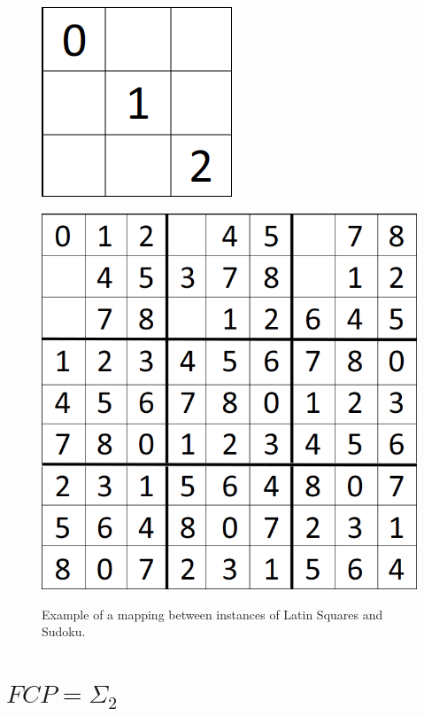 \documentclass[runningheads,a4paper]{llncs}
\begin{document}
\begin{figure}[H]
\begin{minipage}{0.45\textwidth}
\includegraphics[scale=0.25]{sudoku-3.png}
\label{fig:partialNP}
\end{minipage}
\hfill
\begin{minipage}{0.45\textwidth}
\centering
\label{fig:partialLS}
\includegraphics[scale=0.25]{sudoku-1.png}
\end{minipage}
\caption{Example of a mapping between instances of Latin Squares and Sudoku.}
\end{figure}

\section{$FCP = \Sigma_2$}
\end{document}
